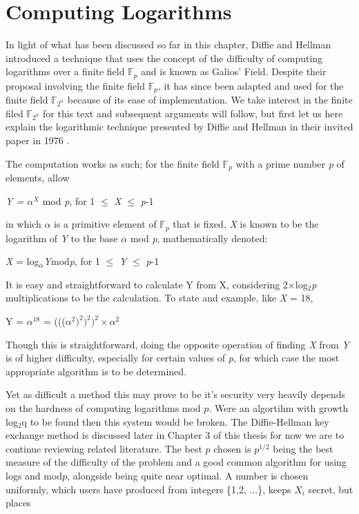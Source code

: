 \documentclass[iwp,first]{luthesis}
\begin{document}
\section{Computing Logarithms}

In light of what has been discussed so far in this chapter, Diffie and Hellman introduced a technique that uses the concept of the difficulty of computing logarithms over a finite field $\mathbb{F}_p$ \cite{GAT} and is known as Galios' Field. Despite their proposal involving the finite field $\mathbb{F}_p$, it has since been adapted and used for the finite field $\mathbb{F}_{2^n}$ because of its ease of implementation. We take interest in the finite filed $\mathbb{F}_{2^n}$ for this text and subsequent arguments will follow, but first let us here explain the logarithmic technique presented by Diffie and Hellman in their invited paper in 1976 \cite{NDCrypt}. 

The computation works as such; for the finite field $\mathbb{F}_p$ with a prime number \textit{p} of elements, allow

\begin{center}
\textit{Y = $\alpha^X$} mod \textit{p}, for 1 $\leq$ \textit{X} $\leq$ \textit{p}-1
\end{center}

in which $\alpha$ is a primitive element of $\mathbb{F}_p$ that is fixed, \textit{X} is known to be the logarithm of \textit{Y} to the base $\alpha$ mod \textit{p}, mathematically denoted:

\begin{center}
\textit{X} = log$_\alpha$\textit{Y}mod\textit{p}, for 1 $\leq$ \textit{Y} $\leq$ \textit{p}-1
\end{center}

It is easy and straightforward to calculate Y from X, considering 2$\times$log$_2$\textit{p} multiplications to be the calculation. To state and example, like \textit{X} = 18,

\begin{center}
Y = $\alpha^{18}$ = ((($\alpha^2)^2)^2)^2 \times \alpha^2$
\end{center}

Though this is straightforward, doing the opposite operation of finding \textit{X} from \textit{Y} is of higher difficulty, especially for certain values of \textit{p}, for which case the most appropriate algorithm is to be determined.

Yet as difficult a method this may prove to be it's security very heavily depends on the hardness of computing logarithms mod $p$. Were an algortihm with growth log$_2$q to be found then this system would be broken. The Diffie-Hellman key exchange method is discussed later in Chapter 3 of this thesis for now we are to continue reviewing related literature. The best $p$ chosen is $p^{1/2}$ being the best measure of the difficulty of the problem and a good common algorithm for using logs and mod$p$, alongside being quite near optimal. A number is chosen uniformly, which users have produced from integers \{1,2, ...\}, keeps $X_i$ secret, but places
\end{document}
